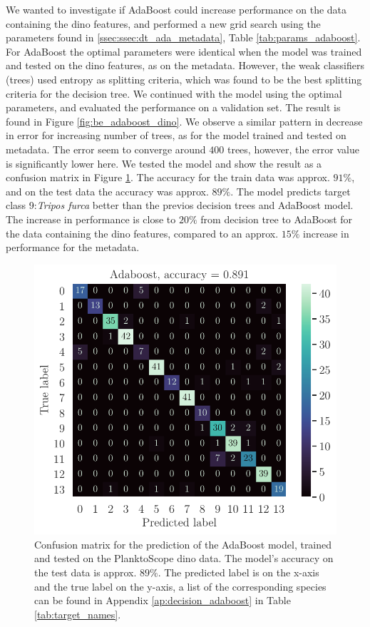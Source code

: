 We wanted to investigate if AdaBoost could increase performance on the data containing the dino features, and performed a new grid search using the parameters found in \ref{ssec:ssec:dt_ada_metadata}, Table \ref{tab:params_adaboost}. For AdaBoost the optimal parameters were identical when the model was trained and tested on the dino features, as on the metadata. However, the weak classifiers (trees) used entropy as splitting criteria, which was found to be the best splitting criteria for the decision tree. We continued with the model using the optimal parameters, and evaluated the performance on a validation set. The result is found in Figure \ref{fig:be_adaboost_dino}. We observe a similar pattern in decrease in error for increasing number of trees, as for the model trained and tested on metadata. The error seem to converge around $400$ trees, however, the error value is significantly lower here. We tested the model and show the result as a confusion matrix in Figure \ref{fig:cm_adaboost_dino}. The accuracy for the train data was approx. $91\%$, and on the test data the accuracy was approx. $89\%$. The model predicts target class 9:\textit{Tripos furca} better than the previos decision trees and AdaBoost model. The increase in performance is close to $20\%$ from decision tree to AdaBoost for the data containing the dino features, compared to an approx. $15\%$ increase in performance for the metadata. 
\begin{figure}
    \centering
    \includegraphics[width=\linewidth]{latex/figures/cm_adaboost_planktoscope_dino_labeled.pdf}
    \caption{Confusion matrix for the prediction of the AdaBoost model, trained and tested on the PlanktoScope dino data. The model's accuracy on the test data is approx. $89\%$. The predicted label is on the x-axis and the true label on the y-axis, a list of the corresponding species can be found in Appendix \ref{ap:decision_adaboost} in Table \ref{tab:target_names}.}
    \label{fig:cm_adaboost_dino}
\end{figure}

